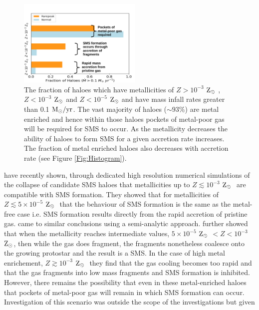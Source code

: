\documentclass[graphics, twocolumn, usenatbib]{mn2e}
\newcommand{\msolaryrc} {$\rm{M_{\odot}/yr}$}
\newcommand{\zsolar} {$\rm{Z_{\odot}}~$}
\newcommand{\zsolarc} {$\rm{Z_{\odot}}$}
\begin{document}
\begin{figure}
   \centering 
\includegraphics[width=0.525\textwidth]{FIGURES/FinalPlot-crop.pdf}
\caption{The fraction of haloes which have metallicities of $Z > 10^{-3}$ \zsolar,
  $Z < 10^{-3}$ \zsolar and $ Z < 10^{-5}$ \zsolar and have mass infall rates greater than
  0.1 \msolaryrc. The vast majority of haloes ($\sim 93$\%) are metal enriched and hence within
  those haloes pockets of metal-poor gas will be required for SMS to occur. As the metallicity
  decreases the ability of haloes to form SMS for a given accretion rate increases. The fraction of
  metal enriched haloes also decreases with accretion rate (see Figure \ref{Fig:Histogram}).} \label{Fig:Fractions}
\end{figure}
\indent \cite{Chon_2020} have recently shown, through dedicated high resolution numerical simulations
of the collapse of candidate SMS haloes that metallicities up to $Z \lesssim 10^{-3}$ \zsolar
are compatible with SMS formation. They showed that for metallicities of $Z \lesssim 5 \times 10^{-5}$ \zsolar
that the behaviour of SMS formation is the same as the metal-free case i.e. SMS formation results
directly from the rapid accretion of pristine gas. \cite{Tagawa_2020} came to similar conclusions
using a semi-analytic approach. \cite{Chon_2020} further showed that when the metallicity
reaches intermediate values, $5 \times 10^{-5}$ \zsolar $ < Z < 10^{-3}$ \zsolarc, then while
the gas does fragment, the fragments nonetheless coalesce onto the growing protostar and the
result is a SMS. In the case of high metal enrichement,  $Z \gtrsim 10^{-3}$ \zsolar
they find that the gas cooling becomes too rapid and that the gas fragments into low mass fragments
and SMS formation is inhibited. However, there remains the possibility that even in these
metal-enriched haloes that pockets of metal-poor gas will remain in which SMS formation can occur.
Investigation of this scenario was outside the scope of the \cite{Chon_2020} investigations but given
\end{document}
